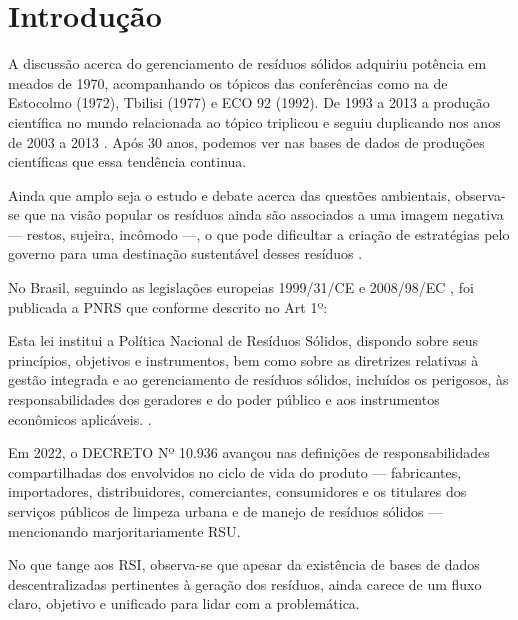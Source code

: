 \chapter{Introdução}

A discussão acerca do gerenciamento de resíduos sólidos adquiriu potência em meados de 1970, acompanhando os tópicos das conferências como na de Estocolmo (1972), Tbilisi (1977) e ECO 92 (1992). De 1993 a 2013 a produção científica no mundo relacionada ao tópico triplicou e seguiu duplicando nos anos de 2003 a 2013 \cite{deus_residuos_2015}. Após 30 anos, podemos ver nas bases de dados de produções científicas que essa tendência continua.

Ainda que amplo seja o estudo e debate acerca das questões ambientais, observa-se que na visão popular os resíduos ainda são associados a uma imagem negativa — restos, sujeira, incômodo —, o que pode dificultar a criação de estratégias pelo governo para uma destinação sustentável desses resíduos \cite{santiago_gestao_2016}.

No Brasil, seguindo as legislações europeias 1999/31/CE \cite{noauthor_directiva_1999} e 2008/98/EC \cite{noauthor_directive_2018}, foi publicada a \gls{PNRS} que conforme descrito no Art 1º:

\begin{citacao}
	Esta lei institui a Política Nacional de Resíduos Sólidos, dispondo sobre seus princípios, objetivos e instrumentos, bem como sobre as diretrizes relativas à gestão integrada e ao gerenciamento de resíduos sólidos, incluídos os perigosos, às responsabilidades dos geradores e do poder público e aos instrumentos econômicos aplicáveis. \cite[Art. 1º]{brasil_lei_nodate}.
\end{citacao}

Em 2022, o DECRETO Nº 10.936 \cite{brasil_decreto_2022} avançou nas definições de responsabilidades compartilhadas dos envolvidos no ciclo de vida do produto — fabricantes, importadores, distribuidores, comerciantes, consumidores e os titulares dos serviços públicos de limpeza urbana e de manejo de resíduos sólidos — mencionando marjoritariamente \gls{RSU}.

No que tange aos \gls{RSI}, observa-se que apesar da existência de bases de dados descentralizadas pertinentes à geração dos resíduos, ainda carece de um fluxo claro, objetivo e unificado para lidar com a problemática.

